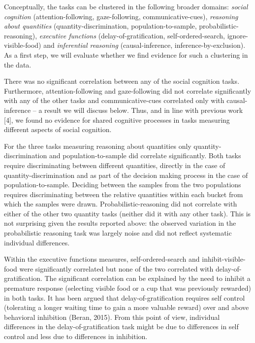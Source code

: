 \documentclass[
  man,floatsintext]{apa6}
\begin{document}
Conceptually, the tasks can be clustered in the following broader domains: \emph{social cognition} (attention-following, gaze-following, communicative-cues), \emph{reasoning about quantities} (quantity-discrimination, population-to-sample, probabilistic-reasoning), \emph{executive functions} (delay-of-gratification, self-ordered-search, ignore-visible-food) and \emph{inferential reasoning} (causal-inference, inference-by-exclusion). As a first step, we will evaluate whether we find evidence for such a clustering in the data.

There was no significant correlation between any of the social cognition tasks. Furthermore, attention-following and gaze-following did not correlate significantly with any of the other tasks and communicative-cues correlated only with causal-inference -- a result we will discuss below. Thus, and in line with previous work {[}4{]}, we found no evidence for shared cognitive processes in tasks measuring different aspects of social cognition.

For the three tasks measuring reasoning about quantities only quantity-discrimination and population-to-sample did correlate significantly. Both tasks require discriminating between different quantities, directly in the case of quantity-discrimination and as part of the decision making process in the case of population-to-sample. Deciding between the samples from the two populations requires discriminating between the relative quantities within each bucket from which the samples were drawn. Probabilistic-reasoning did not correlate with either of the other two quantity tasks (neither did it with any other task). This is not surprising given the results reported above: the observed variation in the probabilistic reasoning task was largely noise and did not reflect systematic individual differences.

Within the executive functions measures, self-ordered-search and inhibit-visible-food were significantly correlated but none of the two correlated with delay-of-gratification. The significant correlation can be explained by the need to inhibit a premature response (selecting visible food or a cup that was previously rewarded) in both tasks. It has been argued that delay-of-gratification requires self control (tolerating a longer waiting time to gain a more valuable reward) over and above behavioral inhibition (Beran, 2015). From this point of view, individual differences in the delay-of-gratification task might be due to differences in self control and less due to differences in inhibition.
\end{document}
